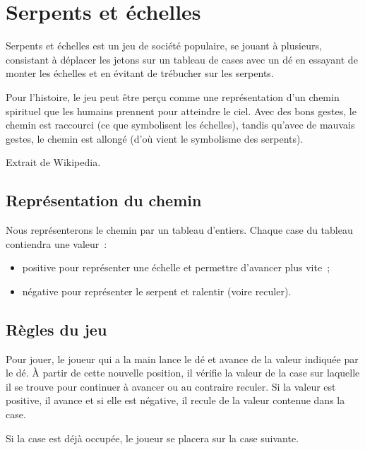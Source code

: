 	\section{Serpents et échelles}

		Serpents et échelles est un jeu de société
		populaire, se jouant à plusieurs, consistant à déplacer les jetons sur un
		tableau de cases avec un dé en essayant de monter les échelles et en évitant
		de trébucher sur les serpents.	
	
		Pour l’histoire, le jeu peut être perçu comme une représentation d’un chemin
		spirituel que les humains prennent pour atteindre le ciel. Avec des bons
		gestes, le chemin est raccourci (ce que symbolisent les échelles), tandis
		qu’avec de mauvais gestes, le chemin est allongé (d’où vient le symbolisme des
		serpents).
		\begin{flushright}
			Extrait de Wikipedia.		
		\end{flushright}
		
		\subsection*{Représentation du chemin}
		
			Nous représenterons le chemin par un tableau d’entiers. 
			Chaque case du tableau contiendra une valeur~:
			\begin{itemize}
				\item positive pour représenter une échelle et permettre d’avancer plus vite~;
				\item négative pour représenter le serpent et ralentir (voire reculer).
			\end{itemize}
	
		\subsection*{Règles du jeu}
		
			Pour jouer, le joueur qui a la main lance le dé et avance de la valeur
			indiquée par le dé. À partir de cette nouvelle position, il vérifie la
			valeur de la case sur laquelle il se trouve pour continuer à avancer ou au
			contraire reculer. Si la valeur est positive, il avance et si elle est
			négative, il recule de la valeur contenue dans la case.
		
			Si la case est déjà occupée, le joueur se placera sur la case suivante. 
		

